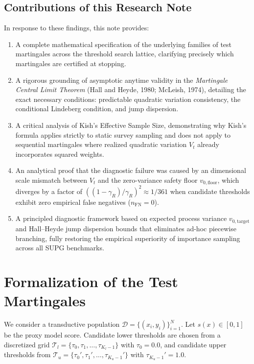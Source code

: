 \documentclass[11pt,a4paper]{article}
\begin{document}
\subsection{Contributions of this Research Note}
In response to these findings, this note provides:
\begin{enumerate}[leftmargin=*]
    \item A complete mathematical specification of the underlying families of test martingales across the threshold search lattice, clarifying precisely which martingales are certified at stopping.
    \item A rigorous grounding of asymptotic anytime validity in the \emph{Martingale Central Limit Theorem} (Hall and Heyde, 1980; McLeish, 1974), detailing the exact necessary conditions: predictable quadratic variation consistency, the conditional Lindeberg condition, and jump dispersion.
    \item A critical analysis of Kish's Effective Sample Size, demonstrating why Kish's formula applies strictly to static survey sampling and does not apply to sequential martingales where realized quadratic variation $V_t$ already incorporates squared weights.
    \item An analytical proof that the diagnostic failure was caused by an dimensional scale mismatch between $V_t$ and the zero-variance safety floor $v_{0, \text{floor}}$, which diverges by a factor of $((1 - \gamma_R)/\gamma_R)^2 \approx 1/361$ when candidate thresholds exhibit zero empirical false negatives ($n_{\text{FN}} = 0$).
    \item A principled diagnostic framework based on expected process variance $v_{0, \text{target}}$ and Hall--Heyde jump dispersion bounds that eliminates ad-hoc piecewise branching, fully restoring the empirical superiority of importance sampling across all SUPG benchmarks.
\end{enumerate}

\newpage
\section{Formalization of the Test Martingales}

We consider a transductive population $\mathcal{D} = \{(x_i, y_i)\}_{i=1}^N$. Let $s(x) \in [0, 1]$ be the proxy model score. Candidate lower thresholds are chosen from a discretized grid $\mathcal{T}_l = \{\tau_0, \tau_1, \dots, \tau_{K_l-1}\}$ with $\tau_0 = 0.0$, and candidate upper thresholds from $\mathcal{T}_u = \{\tau_0', \tau_1', \dots, \tau_{K_u-1}'\}$ with $\tau_{K_u-1}' = 1.0$.
\end{document}
